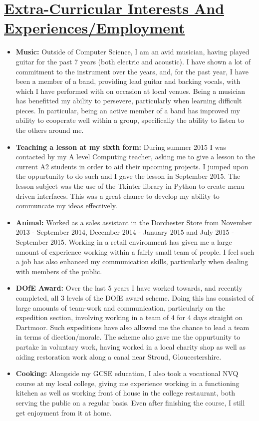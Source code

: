 \documentclass[11pt]{article}
\begin{document}
	\vspace{-20pt}
	\hspace{-100pt}\section*{\underline{Extra-Curricular Interests And Experiences/Employment}}
			\begin{itemize}
				\item \textbf{Music:} Outside of Computer Science, I am an avid musician, having played guitar for the past 7 years (both electric and acoustic). I have shown a lot of commitment to the instrument over the years,  and, for the past year, I have been a member of a band, providing lead guitar and backing vocals, with which I have performed with on occasion at local venues. Being a musician has benefitted my ability to persevere, particularly when learning difficult pieces. In particular, being an active member of a band has improved my ability to cooperate well within a group, specifically the ability to listen to the others around me. 
				\item \textbf{Teaching a lesson at my sixth form:} During summer 2015 I was contacted by my A level Computing teacher, asking me to give a lesson to the current A2 students in order to aid their upcoming projects. I jumped upon the oppurtunity to do such and I gave the lesson in September 2015. The lesson subject was the use of the Tkinter library in Python to create menu driven interfaces. This was a great chance to develop my ability to communcate my ideas effectively.
				\item \textbf{Animal:} Worked as a sales assistant in the Dorchester Store from November 2013 - September 2014, December 2014 - January 2015 and July 2015 - September 2015. Working in a retail environment has given me a large amount of experience working within a fairly small team of people. I feel such a job has also enhanced my communication skills, particularly when dealing with members of the public. 
				\item \textbf{DOfE Award:} Over the last 5 years I have worked towards, and recently completed, all 3 levels of the DOfE award scheme. Doing this has consisted of large amounts of team-work and communication, particularly on the expedition section, involving working in a team of 4 for 4 days straight on Dartmoor. Such expeditions have also allowed me the chance to lead a team in terms of diection/morale. The scheme also gave me the oppurtunity to partake in voluntary work, having worked in a local charity shop as well as aiding restoration work along a canal near Stroud, Gloucestershire.
				\item \textbf{Cooking:} Alongside my GCSE education, I also took a vocational NVQ course at my local college, giving me experience working in a functioning kitchen as well as working front of house in the college restaurant, both serving the public on a regular basis. Even after finishing the course, I still get enjoyment from it at home.
			\end{itemize}
				
\end{document}
